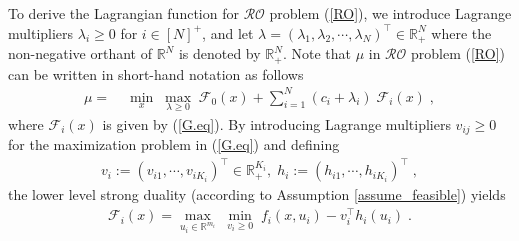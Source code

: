 \documentclass[journal,twoside,web]{ieeecolor}
\begin{document}
To derive the Lagrangian function for $\mathcal{RO}$ problem (\ref{RO}), we introduce Lagrange multipliers $\lambda_i\geq 0$ for $i\in[N]^+$, and let $\lambda=(\lambda_1,\lambda_2,\cdots,\lambda_N)^\top \in \mathbb{R}_+^N$ where the non-negative orthant of $\mathbb{R}^N$ is denoted by $\mathbb{R}_+^N$. Note that $\mu$ in $\mathcal{RO}$ problem (\ref{RO}) can be written in short-hand notation  as follows
\begin{align}
\mu=&\;\underset{x}{\min}\;\underset{\lambda\geq 0}{\max}\; \mathcal{F}_0(x)+\sum_{i=1}^N (c_i+\lambda_i) \; \mathcal{F}_i(x)\;,
 \label{upper_ro}
\end{align}
where $\mathcal{F}_i(x)$ is given by (\ref{G.eq}).
 By introducing Lagrange multipliers $v_{ij} \geq 0$ for the maximization problem in (\ref{G.eq}) and defining
\begin{align*}
v_i:=(v_{i1},\cdots, v_{iK_i})^\top \in \mathbb{R}_+^{K_i},\;h_i:=(h_{i1},\cdots, h_{iK_i})^\top\;,\nonumber
\end{align*}
the lower level strong duality (according to Assumption \ref{assume_feasible}) yields
\begin{align} \label{lower_ro}
\mathcal{F}_i(x)=\underset{u_i\in \mathbb{R}^{m_i}}{\max}\;\underset{v_{i}\geq 0}{\min}\;f_i(x,u_i)-v_i^\top h_{i}(u_i)\;.
\end{align}
\end{document}
